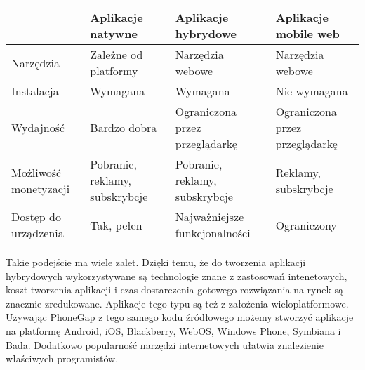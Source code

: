 \documentclass[a4paper]{article}
\begin{document}
\begin{center}
    \begin{tabular}{ |  p{2cm} | p{4cm} | p{4cm} | p{4cm} |}
    \hline
   			& Aplikacje natywne        & Aplikacje hybrydowe 	& Aplikacje mobile web 			\\ \hline
    Narzędzia	& Zależne od platformy	&   Narzędzia webowe	& 	Narzędzia webowe			\\ \hline
    Instalacja	&        Wymagana               &	 Wymagana         	& 		Nie wymagana		\\ \hline
    Wydajność	& 	Bardzo dobra		&Ograniczona przez przeglądarkę&Ograniczona przez przeglądarkę\\ \hline
    Możliwość monetyzacji
    			&  Pobranie, reklamy, subskrybcje  & Pobranie, reklamy, subskrybcje & Reklamy, subskrybcje \\ \hline
    Dostęp do urządzenia
    			& 	Tak, pełen  	         &Najważniejsze funkcjonalności& Ograniczony        \\ \hline
    \end{tabular}
\end{center}

Takie podejście ma wiele zalet. Dzięki temu, że do tworzenia aplikacji hybrydowych wykorzystywane są technologie
znane z zastosowań intenetowych, koszt tworzenia aplikacji i czas dostarczenia
gotowego rozwiązania na rynek są znacznie zredukowane. Aplikacje tego typu są też
z założenia wieloplatformowe. Używając PhoneGap z tego samego kodu źródłowego
możemy stworzyć aplikacje na platformę Android, iOS, Blackberry, WebOS,
Windows Phone, Symbiana i Bada. Dodatkowo popularność narzędzi internetowych
ułatwia znalezienie właściwych programistów.
\end{document}
